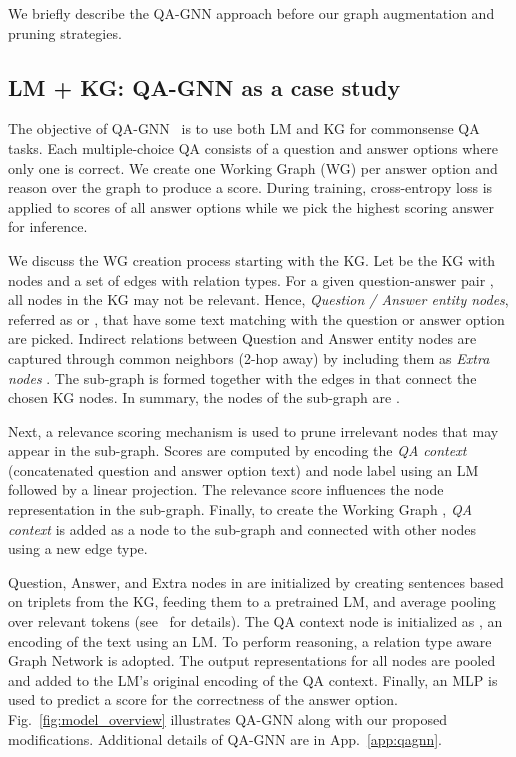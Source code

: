 \documentclass[11pt]{article}
\begin{document}
We briefly describe the QA-GNN approach before our graph augmentation and pruning strategies.



\subsection{LM + KG: QA-GNN as a case study}
The objective of QA-GNN~\cite{yasunaga-etal-2021-qa} is to use both LM and KG for commonsense QA tasks.
Each multiple-choice QA consists of a question  and  answer options  where only one is correct.
We create one Working Graph (WG) per answer option and reason over the graph to produce a score.
During training, cross-entropy loss is applied to scores of all answer options while we pick the highest scoring answer for inference.


We discuss the WG creation process starting with the KG.
Let  be the KG with  nodes and a set of edges  with  relation types. 
For a given question-answer pair , all nodes in the KG may not be relevant.
Hence, \emph{Question / Answer entity nodes}, referred as  or , that have some text matching with the question  or answer option  are picked.
Indirect relations between Question and Answer entity nodes are captured through common neighbors (2-hop away) by including them as \emph{Extra nodes} .
The sub-graph  is formed together with the edges in  that connect the chosen KG nodes.
In summary, the nodes of the sub-graph are .

Next, a relevance scoring mechanism is used to prune irrelevant nodes that may appear in the sub-graph.
Scores are computed by encoding the \emph{QA context} (concatenated question and answer option text) and node label using an LM followed by a linear projection.
The relevance score influences the node representation in the sub-graph.
Finally, to create the Working Graph , \emph{QA context} is added as a node to the sub-graph and connected with other nodes using a new edge type.


Question, Answer, and Extra nodes in  are initialized by creating sentences based on triplets from the KG, feeding them to a pretrained LM, and average pooling over relevant tokens (see~\cite{feng-etal-2020-scalable} for details).
The QA context node is initialized as , an encoding of the  text using an LM.
To perform reasoning, a relation type aware Graph Network is adopted.
The output representations for all nodes are pooled and added to the LM's original encoding of the QA context.
Finally, an MLP is used to predict a score for the correctness of the answer option.
Fig.~\ref{fig:model_overview} illustrates QA-GNN along with our proposed modifications.
Additional details of QA-GNN are in App.~\ref{app:qagnn}.
\end{document}
